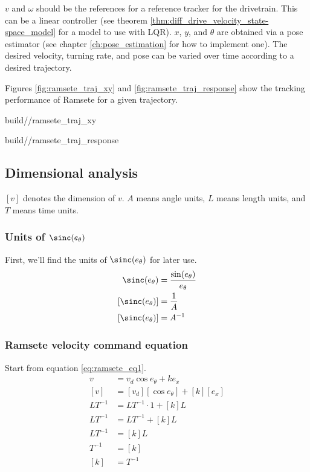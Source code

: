 $v$ and $\omega$ should be the \glspl{reference} for a \gls{reference} tracker
for the drivetrain. This can be a linear controller (see theorem
\ref{thm:diff_drive_velocity_state-space_model} for a model to use with LQR).
$x$, $y$, and $\theta$ are obtained via a \gls{pose} estimator (see chapter
\ref{ch:pose_estimation} for how to implement one). The desired velocity,
turning rate, and \gls{pose} can be varied over time according to a desired
trajectory.

Figures \ref{fig:ramsete_traj_xy} and \ref{fig:ramsete_traj_response} show the
tracking performance of Ramsete for a given trajectory.
\begin{bookfigure}
  \begin{minisvg}{2}{build/\chapterpath/ramsete_traj_xy}
    \caption{Ramsete nonlinear controller x-y plot}
    \label{fig:ramsete_traj_xy}
  \end{minisvg}
  \hfill
  \begin{minisvg}{2}{build/\chapterpath/ramsete_traj_response}
    \caption{Ramsete nonlinear controller response}
    \label{fig:ramsete_traj_response}
  \end{minisvg}
\end{bookfigure}

\subsection{Dimensional analysis}

$[v]$ denotes the dimension of $v$. $A$ means angle units, $L$ means length
units, and $T$ means time units.

\subsubsection{Units of $\sinc(e_\theta)$}

First, we'll find the units of $\sinc(e_\theta)$ for later use.
\begin{align*}
  \sinc(e_\theta) &= \frac{\sin(e_\theta)}{e_\theta} \\
  [\sinc(e_\theta)] &= \frac{1}{A} \\
  [\sinc(e_\theta)] &= A^{-1}
\end{align*}

\subsubsection{Ramsete velocity command equation}

Start from equation \eqref{eq:ramsete_eq1}.
\begin{align*}
  v &= v_d \cos e_\theta + k e_x \\
  [v] &= [v_d] [\cos e_\theta] + [k] [e_x] \\
  L T^{-1} &= L T^{-1} \cdot 1 + [k] L \\
  L T^{-1} &= L T^{-1} + [k] L \\
  L T^{-1} &= [k] L \\
  T^{-1} &= [k] \\
  [k] &= T^{-1}
\end{align*}

